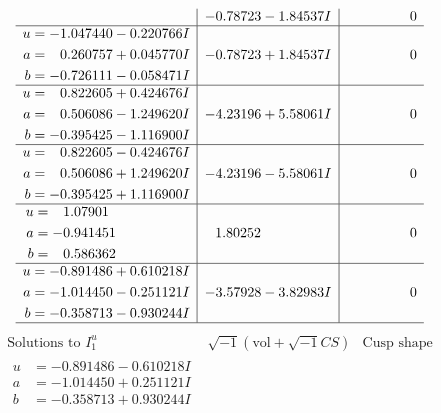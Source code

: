 \documentclass[1p]{elsarticle_modified}
\theoremstyle{definition}
\newcommand{\I}{\sqrt{-1}}
\begin{document}
$$\begin{array}{c|c|c}
 & -0.78723 - 1.84537 I & \phantom{-0.000000 } 0 \\ \hline\begin{aligned}
u &= -1.047440 - 0.220766 I \\
a &= \phantom{-}0.260757 + 0.045770 I \\
b &= -0.726111 - 0.058471 I\end{aligned}
 & -0.78723 + 1.84537 I & \phantom{-0.000000 } 0 \\ \hline\begin{aligned}
u &= \phantom{-}0.822605 + 0.424676 I \\
a &= \phantom{-}0.506086 - 1.249620 I \\
b &= -0.395425 - 1.116900 I\end{aligned}
 & -4.23196 + 5.58061 I & \phantom{-0.000000 } 0 \\ \hline\begin{aligned}
u &= \phantom{-}0.822605 - 0.424676 I \\
a &= \phantom{-}0.506086 + 1.249620 I \\
b &= -0.395425 + 1.116900 I\end{aligned}
 & -4.23196 - 5.58061 I & \phantom{-0.000000 } 0 \\ \hline\begin{aligned}
u &= \phantom{-}1.07901\phantom{ +0.000000I} \\
a &= -0.941451\phantom{ +0.000000I} \\
b &= \phantom{-}0.586362\phantom{ +0.000000I}\end{aligned}
 & \phantom{-}1.80252\phantom{ +0.000000I} & \phantom{-0.000000 } 0 \\ \hline\begin{aligned}
u &= -0.891486 + 0.610218 I \\
a &= -1.014450 - 0.251121 I \\
b &= -0.358713 - 0.930244 I\end{aligned}
 & -3.57928 - 3.82983 I & \phantom{-0.000000 } 0\\
 \hline 
 \end{array}$$\newpage$$\begin{array}{c|c|c}  
\text{Solutions to }I^u_{1}& \I (\text{vol} + \sqrt{-1}CS) & \text{Cusp shape}\\
 \hline 
\begin{aligned}
u &= -0.891486 - 0.610218 I \\
a &= -1.014450 + 0.251121 I \\
b &= -0.358713 + 0.930244 I\end{aligned}

\end{array}$$
\end{document}
